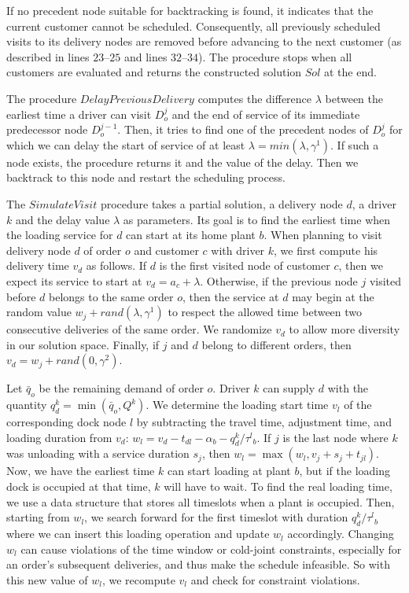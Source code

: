 \documentclass{article}
\begin{document}
If no precedent node suitable for backtracking is found, it indicates that the current customer cannot be scheduled. Consequently, all previously scheduled visits to its delivery nodes are removed before advancing to the next customer (as described in lines $23$--$25$ and lines $32$--$34$). The procedure stops when all customers are evaluated and returns the constructed solution $Sol$ at the end.

The procedure $DelayPreviousDelivery$ computes the difference $\lambda$ between the earliest time a driver can visit $D^{j}_o$ and the end of service of its immediate predecessor node $D^{j-1}_o$. Then, it tries to find one of the precedent nodes of $D^{j}_o$ for which we can delay the start of service of at least $\lambda = min(\lambda,\gamma^1)$. If such a node exists, the procedure returns it and the value of the delay. Then we backtrack to this node and restart the scheduling process.

The $SimulateVisit$ procedure takes a partial solution, a delivery node $d$, a driver $k$ and the delay value $\lambda$ as parameters. Its goal is to find the earliest time when the loading service for $d$ can start at its home plant $b$. When planning to visit delivery node $d$ of order $o$ and customer $c$ with driver $k$, we first compute his delivery time $v_d$ as follows. If $d$ is the first  visited node of customer $c$, then we expect its service to start at $v_d = a_c + \lambda$. Otherwise, if the previous node $j$ visited before $d$ belongs to the same order $o$, then the service at $d$ may begin at the random value $w_j + rand(\lambda, \gamma^1)$ to respect the allowed time between two consecutive deliveries of the same order. We randomize $v_d$ to allow more diversity in our solution space. Finally, if $j$ and $d$ belong to different orders, then $v_d = w_j + rand(0,\gamma^2)$.

Let $\bar{q}_o$ be the remaining demand of order $o$. Driver $k$ can supply $d$ with the quantity $q^k_d= \min(\bar{q}_o,Q^k)$. We determine the loading start time $v_l$ of the corresponding dock node $l$ by subtracting the travel time, adjustment time, and loading duration from $v_d$: $w_l = v_d - t_{dl} - \alpha_b - q^k_{d}/\tau^l{_b} $. If $j$ is the last node where $k$ was unloading with a service duration $s_j$, then $w_l= \max(w_l, v_j + s_{j} + t_{jl})$. Now, we have the earliest time $k$ can start loading at plant $b$, but if the loading dock is occupied at that time, $k$ will have to wait. To find the real loading time, we use a data structure that stores all timeslots when a plant is occupied. Then, starting from $w_l$, we search forward for the first timeslot with duration $q^k_{d}/\tau^l{_b}$ where we can insert this loading operation and update $w_l$ accordingly. Changing $w_l$ can cause violations of the time window or cold-joint constraints, especially for an order's subsequent deliveries, and thus make the schedule infeasible. So with this new value of $w_l$, we recompute $v_l$ and check for constraint violations.
\end{document}

